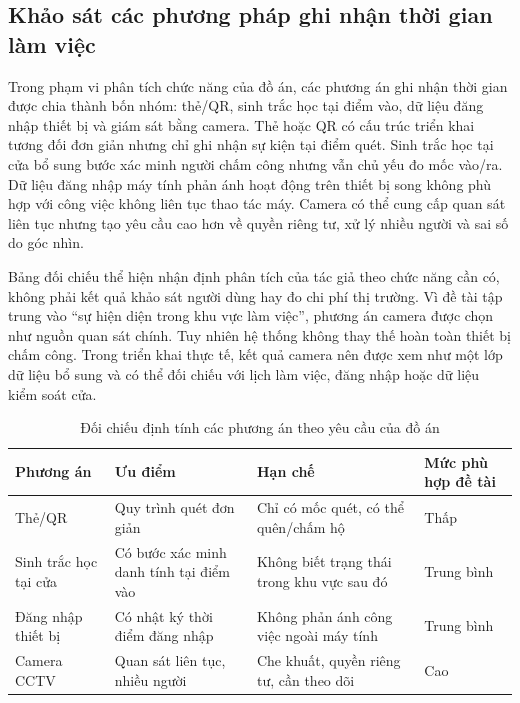 \setcounter{section}{3}
\setcounter{subsection}{0}
\setcounter{subsubsection}{0}

\subsection{Khảo sát các phương pháp ghi nhận thời gian làm việc}
Trong phạm vi phân tích chức năng của đồ án, các phương án ghi nhận thời gian được chia thành bốn nhóm: thẻ/QR, sinh trắc học tại điểm vào, dữ liệu đăng nhập thiết bị và giám sát bằng camera. Thẻ hoặc QR có cấu trúc triển khai tương đối đơn giản nhưng chỉ ghi nhận sự kiện tại điểm quét. Sinh trắc học tại cửa bổ sung bước xác minh người chấm công nhưng vẫn chủ yếu đo mốc vào/ra. Dữ liệu đăng nhập máy tính phản ánh hoạt động trên thiết bị song không phù hợp với công việc không liên tục thao tác máy. Camera có thể cung cấp quan sát liên tục nhưng tạo yêu cầu cao hơn về quyền riêng tư, xử lý nhiều người và sai số do góc nhìn.

Bảng đối chiếu thể hiện nhận định phân tích của tác giả theo chức năng cần có, không phải kết quả khảo sát người dùng hay đo chi phí thị trường. Vì đề tài tập trung vào ``sự hiện diện trong khu vực làm việc'', phương án camera được chọn như nguồn quan sát chính. Tuy nhiên hệ thống không thay thế hoàn toàn thiết bị chấm công. Trong triển khai thực tế, kết quả camera nên được xem như một lớp dữ liệu bổ sung và có thể đối chiếu với lịch làm việc, đăng nhập hoặc dữ liệu kiểm soát cửa.

\begin{table}[H]
\centering
\caption{Đối chiếu định tính các phương án theo yêu cầu của đồ án}
\label{tab:attendance-comparison}
\begin{tabularx}{\textwidth}{p{3.1cm}X X X}
\toprule
\textbf{Phương án} & \textbf{Ưu điểm} & \textbf{Hạn chế} & \textbf{Mức phù hợp đề tài}\\
\midrule
Thẻ/QR & Quy trình quét đơn giản & Chỉ có mốc quét, có thể quên/chấm hộ & Thấp\\
Sinh trắc học tại cửa & Có bước xác minh danh tính tại điểm vào & Không biết trạng thái trong khu vực sau đó & Trung bình\\
Đăng nhập thiết bị & Có nhật ký thời điểm đăng nhập & Không phản ánh công việc ngoài máy tính & Trung bình\\
Camera CCTV & Quan sát liên tục, nhiều người & Che khuất, quyền riêng tư, cần theo dõi & Cao\\
\bottomrule
\end{tabularx}
\end{table}

